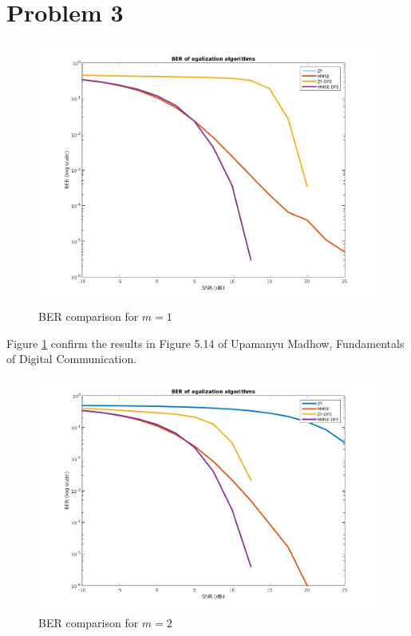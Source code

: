 \documentclass[a4paper]{article}
\begin{document}
\section{Problem 3}

\begin{figure}[ht!]
\centering
\begin{center}
\includegraphics[scale=0.50]{BER-m1.png}
\caption{BER comparison for $m=1$}
\label{m1}
\end{center}
\end{figure}

Figure \ref{m1} confirm the results in Figure 5.14 of Upamanyu Madhow, Fundamentals of Digital Communication.

\begin{figure}[ht!]
\centering
\begin{center}
\includegraphics[scale=0.50]{BER-m2.png}
\caption{BER comparison for $m=2$}
\label{m2}
\end{center}
\end{figure}

\end{document}
